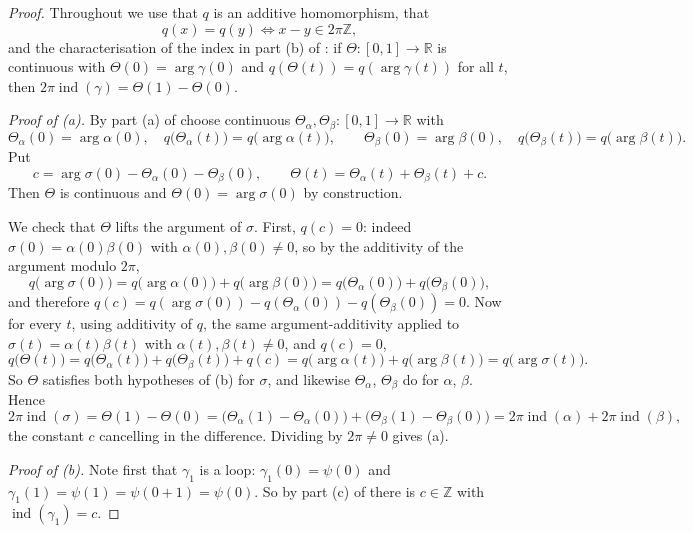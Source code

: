 \begin{proof}
Throughout we use that $q$ is an additive homomorphism, that
\begin{equation}\tag{0}
  q(x)=q(y)\iff x-y\in2\pi\mathbb{Z},
\end{equation}
and the characterisation of the index in part (b) of :
if $\Theta\colon[0,1]\to\mathbb{R}$ is continuous with
$\Theta(0)=\arg\gamma(0)$ and $q(\Theta(t))=q(\arg\gamma(t))$ for all $t$, then
$2\pi\operatorname{ind}(\gamma)=\Theta(1)-\Theta(0)$.

\emph{Proof of (a).}  By part (a) of  choose
continuous $\Theta_\alpha,\Theta_\beta\colon[0,1]\to\mathbb{R}$ with
\[
  \Theta_\alpha(0)=\arg\alpha(0),\quad q\bigl(\Theta_\alpha(t)\bigr)=q\bigl(\arg\alpha(t)\bigr),
  \qquad
  \Theta_\beta(0)=\arg\beta(0),\quad q\bigl(\Theta_\beta(t)\bigr)=q\bigl(\arg\beta(t)\bigr).
\]
Put
\[
  c=\arg\sigma(0)-\Theta_\alpha(0)-\Theta_\beta(0),
  \qquad
  \Theta(t)=\Theta_\alpha(t)+\Theta_\beta(t)+c .
\]
Then $\Theta$ is continuous and $\Theta(0)=\arg\sigma(0)$ by construction.

We check that $\Theta$ lifts the argument of $\sigma$.  First,
$q(c)=0$: indeed $\sigma(0)=\alpha(0)\beta(0)$ with $\alpha(0),\beta(0)\neq0$,
so by the additivity of the argument modulo $2\pi$,
\[
  q\bigl(\arg\sigma(0)\bigr)=q\bigl(\arg\alpha(0)\bigr)+q\bigl(\arg\beta(0)\bigr)
  =q\bigl(\Theta_\alpha(0)\bigr)+q\bigl(\Theta_\beta(0)\bigr),
\]
and therefore
$q(c)=q(\arg\sigma(0))-q(\Theta_\alpha(0))-q(\Theta_\beta(0))=0$.  Now for every
$t$, using additivity of $q$, the same argument-additivity applied to
$\sigma(t)=\alpha(t)\beta(t)$ with $\alpha(t),\beta(t)\neq0$, and $q(c)=0$,
\[
  q\bigl(\Theta(t)\bigr)=q\bigl(\Theta_\alpha(t)\bigr)+q\bigl(\Theta_\beta(t)\bigr)+q(c)
  =q\bigl(\arg\alpha(t)\bigr)+q\bigl(\arg\beta(t)\bigr)
  =q\bigl(\arg\sigma(t)\bigr).
\]
So $\Theta$ satisfies both hypotheses of (b) for
$\sigma$, and likewise $\Theta_\alpha$, $\Theta_\beta$ do for $\alpha$,
$\beta$.  Hence
\[
  2\pi\operatorname{ind}(\sigma)=\Theta(1)-\Theta(0)
  =\bigl(\Theta_\alpha(1)-\Theta_\alpha(0)\bigr)+\bigl(\Theta_\beta(1)-\Theta_\beta(0)\bigr)
  =2\pi\operatorname{ind}(\alpha)+2\pi\operatorname{ind}(\beta),
\]
the constant $c$ cancelling in the difference.  Dividing by $2\pi\neq0$ gives (a).

\emph{Proof of (b).}  Note first that $\gamma_1$ is a loop: $\gamma_1(0)=\psi(0)$
and $\gamma_1(1)=\psi(1)=\psi(0+1)=\psi(0)$.  So by part (c) of
 there is $c\in\mathbb{Z}$ with
$\operatorname{ind}(\gamma_1)=c$.


\end{proof}
